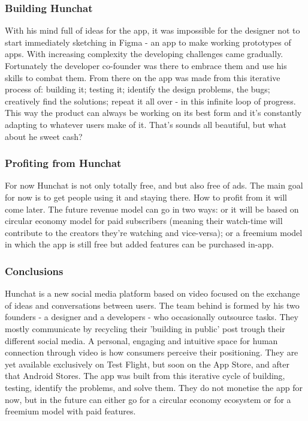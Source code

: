 \documentclass[12pt]{article}
\begin{document}
	\subsubsection{Building Hunchat}
With his mind full of ideas for the app, it was impossible for the designer not to start immediately sketching in Figma - an app to make working prototypes of apps. With increasing complexity the developing challenges came gradually. Fortunately the developer co-founder was there to embrace them and use his skills to combat them. From there on the app was made from this iterative process of: building it; testing it; identify the design problems, the bugs; creatively find the solutions; repeat it all over - in this infinite loop of progress. This way the product can always be working on its best form and it's constantly adapting to whatever users make of it. That's sounds all beautiful, but what about he sweet cash?

	\subsubsection{Profiting from Hunchat}
For now Hunchat is not only totally free, and but also free of ads. The main goal for now is to get people using it and staying there. How to profit from it will come later. The future revenue model can go in two ways: or it will be based on circular economy model for paid subscribers (meaning their watch-time will contribute to the creators they're watching and vice-versa); or a freemium model in which the app is still free but added features can be purchased in-app.

	\subsubsection{Conclusions}
	Hunchat is a new social media platform based on video focused on the exchange of ideas and
conversations between users. The team behind is formed by his two founders - a designer and a developers - who occasionally outsource tasks. They mostly communicate by recycling their 'building
in public' post trough their different social media. A personal, engaging and intuitive space for human connection through video is how consumers perceive their positioning. They are yet available exclusively on Test Flight, but soon on the App Store, and after that Android Stores. The app was built from this iterative cycle of building, testing, identify the problems, and solve them. They do not monetise the app for now, but in the future can either go for a circular economy ecosystem or for a freemium model with paid features.
\end{document}
